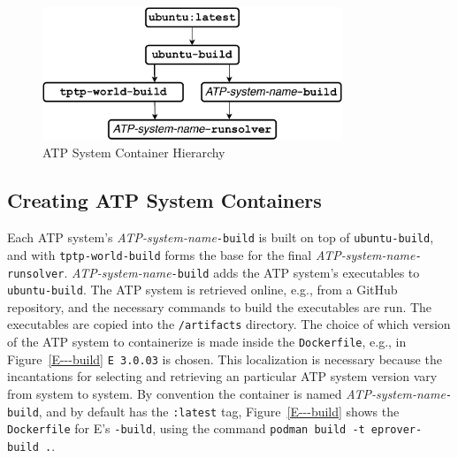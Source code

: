 \documentclass{easychair}
\begin{document}
\begin{figure}[htb]
\begin{center}
\includegraphics[width=0.8\textwidth]{ImageDAG} 
\caption{ATP System Container Hierarchy}
\label{ImageDAG}
\end{center}
\end{figure}

\subsection{Creating ATP System Containers}
\label{BuildingATPSystemImages}

Each ATP system's {\em ATP-system-name}{\tt-build} is built on top of {\tt ubuntu-build}, and 
with {\tt tptp-world-build} forms the base for the final {\em ATP-system-name}{\tt -runsolver}.
{\em ATP-system-name}{\tt-build} adds the ATP system's executables to {\tt ubuntu-build}.
The ATP system is retrieved online, e.g., from a GitHub repository, and the necessary commands
to build the executables are run.
The executables are copied into the {\tt /artifacts} directory.
The choice of which version of the ATP system to containerize is made inside the {\tt Dockerfile},
e.g., in Figure~\ref{E---build} {\tt E 3.0.03} is chosen.
This localization is necessary because the incantations for selecting and retrieving an
particular ATP system version vary from system to system.
By convention the container is named {\em ATP-system-name}{\tt -build}, and by default has
the {\tt :latest} tag,
Figure~\ref{E---build} shows the {\tt Dockerfile} for E's {\tt -build}, using the command 
{\tt podman~build~-t~eprover-build~.}.
\end{document}
